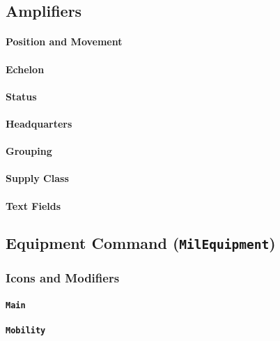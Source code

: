 \documentclass[a4paper, titlepage]{article}
\begin{document}
\subsection{Amplifiers}

\paragraph{Position and Movement}

\paragraph{Echelon}

\paragraph{Status}

\paragraph{Headquarters}

\paragraph{Grouping}

\paragraph{Supply Class}

\paragraph{Text Fields}

\subsection{Equipment Command (\textbf{\texttt{MilEquipment}})}

\subsubsection{Icons and Modifiers}

\paragraph{\texttt{Main}}
%

\paragraph{\texttt{Mobility}}
%
\end{document}
